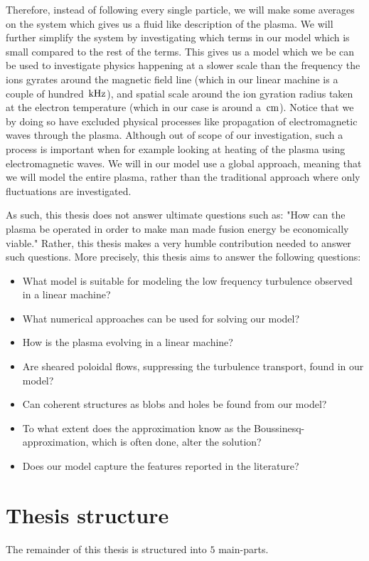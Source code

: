 Therefore, instead of following every single particle, we will make some averages on the system which gives us a fluid like description of the plasma.
We will further simplify the system by investigating which terms in our model which is small compared to the rest of the terms.
This gives us a model which we be can be used to investigate physics happening at a slower scale than the frequency the ions gyrates around the magnetic field line (which in our linear machine is a couple of hundred $\, \text{kHz}$), and spatial scale around the ion gyration radius taken at the electron temperature (which in our case is around a $\, \text{cm}$).
Notice that we by doing so have excluded physical processes like propagation of electromagnetic waves through the plasma.
Although out of scope of our investigation, such a process is important when for example looking at heating of the plasma using electromagnetic waves.
We will in our model use a global approach, meaning that we will model the entire plasma, rather than the traditional approach where only fluctuations are investigated.

As such, this thesis does not answer ultimate questions such as:
"How can the plasma be operated in order to make man made fusion energy be economically viable."
Rather, this thesis makes a very humble contribution needed to answer such questions.
More precisely, this thesis aims to answer the following questions:
%
\begin{itemize}[noitemsep]
    \item What model is suitable for modeling the low frequency turbulence observed in a linear machine?
    \item What numerical approaches can be used for solving our model?
    \item How is the plasma evolving in a linear machine?
    \item Are sheared poloidal flows, suppressing the turbulence transport, found in our model?
    \item Can coherent structures as blobs and holes be found from our model?
    \item To what extent does the approximation know as the Boussinesq-approximation, which is often done, alter the solution?
    \item Does our model capture the features reported in the literature?
\end{itemize}

\section{Thesis structure}
%
The remainder of this thesis is structured into $5$ main-parts.

